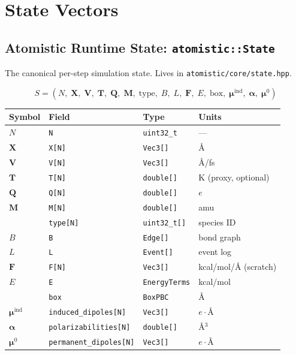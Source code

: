 \documentclass[11pt,a4paper]{article}
\begin{document}
\section{State Vectors}

\subsection{Atomistic Runtime State: \texttt{atomistic::State}}

The canonical per-step simulation state. Lives in \texttt{atomistic/core/state.hpp}.

\[
S = (N,\; \mathbf{X},\; \mathbf{V},\; \mathbf{T},\; \mathbf{Q},\; \mathbf{M},\;
     \mathrm{type},\; B,\; L,\; \mathbf{F},\; E,\; \mathrm{box},\;
     \boldsymbol{\mu}^{\mathrm{ind}},\; \boldsymbol{\alpha},\; \boldsymbol{\mu}^0)
\]

\begin{center}
\begin{tabular}{llll}
\toprule
Symbol & Field & Type & Units \\
\midrule
$N$           & \texttt{N}                  & \texttt{uint32\_t}      & --- \\
$\mathbf{X}$  & \texttt{X[N]}               & \texttt{Vec3[]}         & \AA \\
$\mathbf{V}$  & \texttt{V[N]}               & \texttt{Vec3[]}         & \AA/fs \\
$\mathbf{T}$  & \texttt{T[N]}               & \texttt{double[]}       & K (proxy, optional) \\
$\mathbf{Q}$  & \texttt{Q[N]}               & \texttt{double[]}       & $e$ \\
$\mathbf{M}$  & \texttt{M[N]}               & \texttt{double[]}       & amu \\
              & \texttt{type[N]}            & \texttt{uint32\_t[]}    & species ID \\
$B$           & \texttt{B}                  & \texttt{Edge[]}         & bond graph \\
$L$           & \texttt{L}                  & \texttt{Event[]}        & event log \\
$\mathbf{F}$  & \texttt{F[N]}               & \texttt{Vec3[]}         & kcal/mol/\AA\; (scratch) \\
$E$           & \texttt{E}                  & \texttt{EnergyTerms}    & kcal/mol \\
              & \texttt{box}                & \texttt{BoxPBC}         & \AA \\
$\boldsymbol{\mu}^{\mathrm{ind}}$ & \texttt{induced\_dipoles[N]}   & \texttt{Vec3[]} & $e\cdot$\AA \\
$\boldsymbol{\alpha}$ & \texttt{polarizabilities[N]} & \texttt{double[]}  & \AA$^3$ \\
$\boldsymbol{\mu}^0$  & \texttt{permanent\_dipoles[N]}& \texttt{Vec3[]}  & $e\cdot$\AA \\
\bottomrule
\end{tabular}
\end{center}
\end{document}

